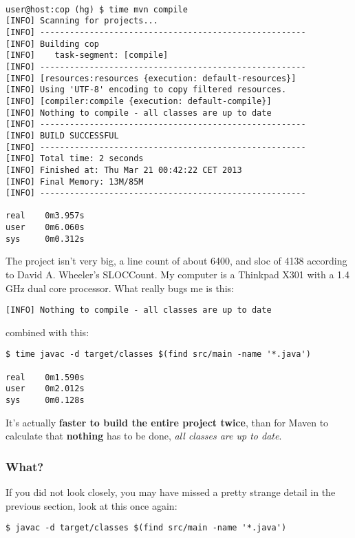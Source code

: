 {\small
\begin{verbatim}

user@host:cop (hg) $ time mvn compile
[INFO] Scanning for projects...
[INFO] ------------------------------------------------------
[INFO] Building cop
[INFO]    task-segment: [compile]
[INFO] ------------------------------------------------------
[INFO] [resources:resources {execution: default-resources}]
[INFO] Using 'UTF-8' encoding to copy filtered resources.
[INFO] [compiler:compile {execution: default-compile}]
[INFO] Nothing to compile - all classes are up to date
[INFO] ------------------------------------------------------
[INFO] BUILD SUCCESSFUL
[INFO] ------------------------------------------------------
[INFO] Total time: 2 seconds
[INFO] Finished at: Thu Mar 21 00:42:22 CET 2013
[INFO] Final Memory: 13M/85M
[INFO] ------------------------------------------------------

real    0m3.957s
user    0m6.060s
sys     0m0.312s
\end{verbatim}
}


The project isn't very big, a line count of about 6400, and sloc of
4138 according to David A. Wheeler's SLOCCount. My computer is a Thinkpad
X301 with a 1.4 GHz dual core processor. What really bugs me is this:


{\small
\begin{verbatim}
[INFO] Nothing to compile - all classes are up to date
\end{verbatim}
}


combined with this:


{\small
\begin{verbatim}
$ time javac -d target/classes $(find src/main -name '*.java')

real    0m1.590s
user    0m2.012s
sys     0m0.128s
\end{verbatim}
}


It's actually \textbf{faster to build the entire project twice}, than for Maven
to calculate that \textbf{nothing} has to be done, \textit{all classes are up to date}.



\subsubsection{ What? }

If you did not look closely, you may have missed a pretty strange detail
in the previous section, look at this once again:


{\small
\begin{verbatim}
$ javac -d target/classes $(find src/main -name '*.java')
\end{verbatim}
}


